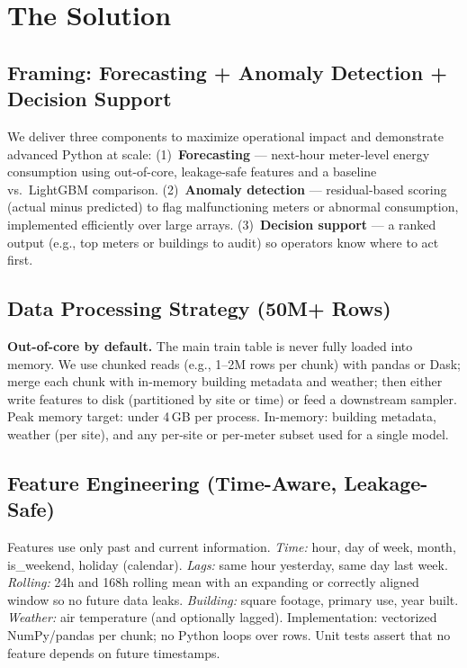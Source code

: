 \documentclass[11pt,a4paper]{article}
\begin{document}
\section{The Solution}

\subsection{Framing: Forecasting + Anomaly Detection + Decision Support}
We deliver three components to maximize operational impact and demonstrate advanced Python at scale: (1)~\textbf{Forecasting} --- next-hour meter-level energy consumption using out-of-core, leakage-safe features and a baseline vs.\ LightGBM comparison. (2)~\textbf{Anomaly detection} --- residual-based scoring (actual minus predicted) to flag malfunctioning meters or abnormal consumption, implemented efficiently over large arrays. (3)~\textbf{Decision support} --- a ranked output (e.g., top meters or buildings to audit) so operators know where to act first.

\subsection{Data Processing Strategy (50M+ Rows)}
\textbf{Out-of-core by default.} The main train table is never fully loaded into memory. We use chunked reads (e.g., 1--2M rows per chunk) with pandas or Dask; merge each chunk with in-memory building metadata and weather; then either write features to disk (partitioned by site or time) or feed a downstream sampler. Peak memory target: under 4\,GB per process. In-memory: building metadata, weather (per site), and any per-site or per-meter subset used for a single model.

\subsection{Feature Engineering (Time-Aware, Leakage-Safe)}
Features use only past and current information. \textit{Time:} hour, day of week, month, is\_weekend, holiday (calendar). \textit{Lags:} same hour yesterday, same day last week. \textit{Rolling:} 24h and 168h rolling mean with an expanding or correctly aligned window so no future data leaks. \textit{Building:} square footage, primary use, year built. \textit{Weather:} air temperature (and optionally lagged). Implementation: vectorized NumPy/pandas per chunk; no Python loops over rows. Unit tests assert that no feature depends on future timestamps.
\end{document}
